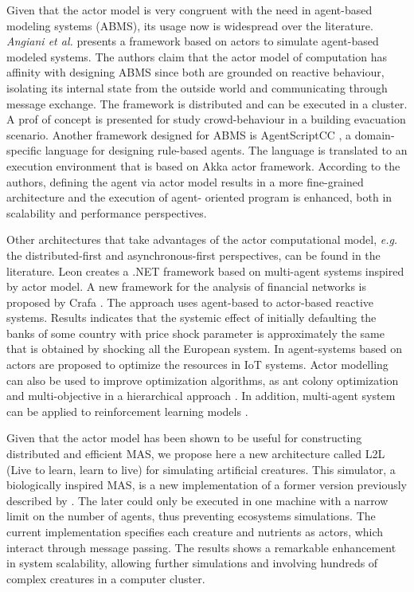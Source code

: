 \documentclass[runningheads]{llncs}
\begin{document}
Given that the actor model is very congruent with the need in agent-based modeling systems (ABMS), its usage now is widespread over the literature.
\textit{Angiani et al.} \cite{angiani2018} presents a framework based on actors to simulate agent-based modeled systems. The authors claim that the actor model of computation has affinity with designing ABMS since both are grounded on reactive behaviour, isolating its internal state from the outside world and communicating through message exchange. The framework is distributed and can be executed in a cluster. A prof of concept is presented for study crowd-behaviour in a building evacuation scenario.
Another framework designed for ABMS is AgentScriptCC \cite{mohajeri2020}, a domain-specific language for designing rule-based agents. The language is translated to an execution environment that is based on Akka actor framework. According to the authors, defining the agent via actor
model results in a more fine-grained architecture and the execution of agent-
oriented program is enhanced, both in scalability and performance perspectives. 

Other architectures that take advantages of the actor computational model, \textit{e.g.} the distributed-first and asynchronous-first perspectives, can be found in the literature. %
Leon \cite{math10030382} creates a .NET framework based on multi-agent systems inspired
by actor model. A new framework for the analysis of financial networks is
proposed by Crafa \cite{Crafa}. The approach uses agent-based to actor-based reactive
systems. Results indicates that the systemic effect of initially defaulting the
banks of some country with price shock parameter is approximately the same
that is obtained by shocking all the European system. In \cite{NGUYEN2021103143} agent-systems
based on actors are proposed to optimize the resources in IoT systems. Actor
modelling can also be used to improve optimization algorithms, as ant colony
optimization \cite{STARZEC2019102573} and multi-objective in a hierarchical approach \cite{idzik}.  In addition,
multi-agent system can be applied to reinforcement learning models \cite{9113746,LI2022117900}.

Given that the actor model has been shown to be useful for constructing distributed and efficient MAS, we propose here a new architecture called L2L (Live to learn, learn to live) for simulating artificial creatures. This simulator, a biologically inspired MAS, is a new implementation of a former version previously described by \cite{Campos}. The later could only be executed in one machine with a narrow limit on the number of agents, thus preventing ecosystems simulations. The current implementation specifies each creature and nutrients as actors, which interact through message passing. The results shows a remarkable enhancement in system scalability, allowing further simulations and involving hundreds of complex creatures in a computer cluster. 
\end{document}
